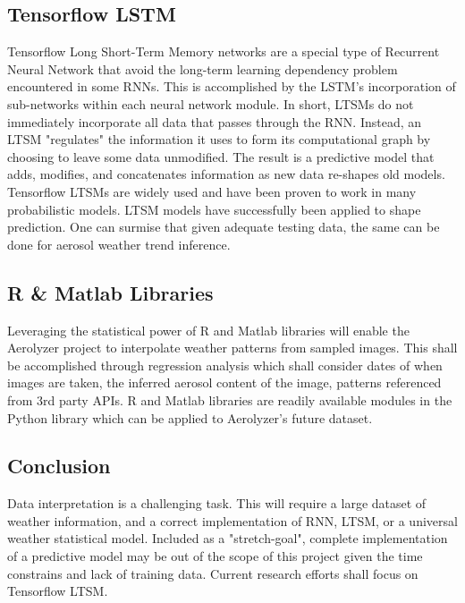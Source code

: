 \documentclass[onecolumn, draftclsnofoot,10pt, compsoc]{IEEEtran}
\begin{document}
\begin{singlespace}
	\subsection{Tensorflow LSTM}
		Tensorflow Long Short-Term Memory networks are a special type of Recurrent Neural Network that avoid the long-term learning dependency problem encountered in some RNNs.
		This is accomplished by the LSTM’s incorporation of sub-networks within each neural network module.
		In short, LTSMs do not immediately incorporate all data that passes through the RNN.
		Instead, an LTSM "regulates" the information it uses to form its computational graph by choosing to leave some data unmodified.
		The result is a predictive model that adds, modifies, and concatenates information as new data re-shapes old models.
		Tensorflow LTSMs are widely used and have been proven to work in many probabilistic models.
		LTSM models have successfully been applied to shape prediction.
		One can surmise that given adequate testing data, the same can be done for aerosol weather trend inference. \cite{LSTM} \cite{LSTM_REG}

	\subsection{R \& Matlab Libraries}
		Leveraging the statistical power of R and Matlab libraries will enable the Aerolyzer project to interpolate weather patterns from sampled images.
		This shall be accomplished through regression analysis which shall consider dates of when images are taken, the inferred aerosol content of the image, patterns referenced from 3rd party APIs.
		R and Matlab libraries are readily available modules in the Python library which can be applied to Aerolyzer’s future dataset. \cite{R} \cite{matlab}

	\subsection{Conclusion}
		Data interpretation is a challenging task.
		This will require a large dataset of weather information, and a correct implementation of RNN, LTSM, or a universal weather statistical model.
		Included as a "stretch-goal", complete implementation of a predictive model may be out of the scope of this project given the time constrains and lack of training data.
		Current research efforts shall focus on Tensorflow LTSM.
	\nocite{*}
	
	

\end{singlespace}
\end{document}
